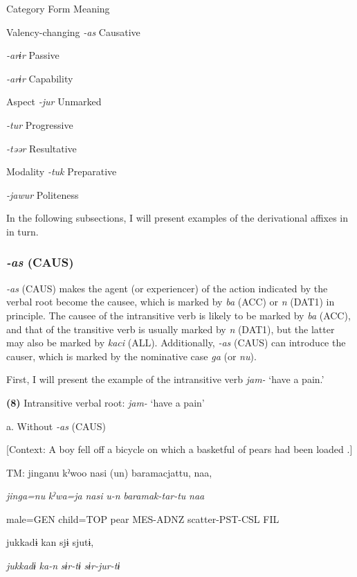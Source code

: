 Category  Form  Meaning

Valency-changing  \textit{{}-as} Causative

  \textit{{}-arɨr} Passive

  \textit{{}-arɨr} Capability

Aspect  \textit{{}-jur} Unmarked

  \textit{{}-tur} Progressive

  \textit{{}-təər} Resultative

Modality  \textit{{}-tuk} Preparative

  \textit{{}-jawur} Politeness

In the following subsections, I will present examples of the derivational affixes in  in turn.

\subsubsection{\textit{{}-as} (CAUS)} 

\textit{{}-as} (CAUS) makes the agent (or experiencer) of the action indicated by the verbal root become the causee, which is marked by \textit{ba} (ACC) or \textit{n} (DAT1) in principle. The causee of the intransitive verb is likely to be marked by \textit{ba} (ACC), and that of the transitive verb is usually marked by \textit{n} (DAT1), but the latter may also be marked by \textit{kaci} (ALL). Additionally, \textit{{}-as} (CAUS) can introduce the causer, which is marked by the nominative case \textit{ga} (or \textit{nu}).

  First, I will present the example of the intransitive verb \textit{jam-} ‘have a pain.’

\textbf{(8)}  Intransitive verbal root: \textit{jam-} ‘have a pain’

  a. Without \textit{-as} (CAUS)

  [Context: A boy fell off a bicycle on which a basketful of pears had been loaded .]

  TM:  jinganu  kˀwoo  nasi  (un)  baramacjattu,  naa,

    \textit{jinga=nu}  \textit{kˀwa=ja}  \textit{nasi}  \textit{u-n}  \textit{baramak-tar-tu}  \textit{naa}

    male=GEN  child=TOP  pear  MES-ADNZ  scatter-PST-CSL  FIL

    jukkadɨ  kan  sjɨ  sjutɨ,

    \textit{jukkadɨ}  \textit{ka-n}  \textit{sɨr-tɨ}  \textit{sɨr-jur-tɨ}

